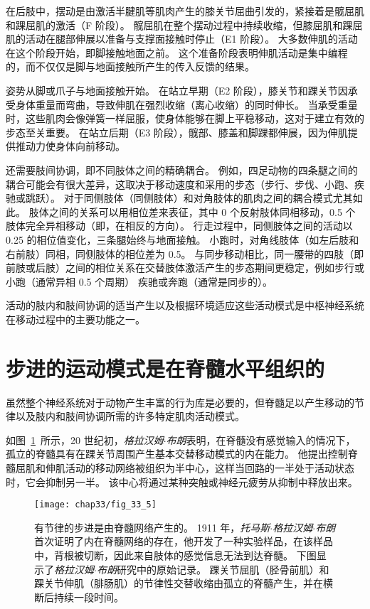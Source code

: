 在后肢中，摆动是由激活半腱肌等肌肉产生的膝关节屈曲引发的，紧接着是髋屈肌和踝屈肌的激活（F 阶段）。
髋屈肌在整个摆动过程中持续收缩，但膝屈肌和踝屈肌的活动在腿部伸展以准备与支撑面接触时停止（E1 阶段）。
大多数伸肌的活动在这个阶段开始，即脚接触地面之前。
这个准备阶段表明伸肌活动是集中编程的，而不仅仅是脚与地面接触所产生的传入反馈的结果。


姿势从脚或爪子与地面接触开始。
在站立早期（E2 阶段），膝关节和踝关节因承受身体重量而弯曲，导致伸肌在强烈收缩（离心收缩）的同时伸长。
当承受重量时，这些肌肉会像弹簧一样屈服，使身体能够在脚上平稳移动，这对于建立有效的步态至关重要。
在站立后期（E3 阶段），髋部、膝盖和脚踝都伸展，因为伸肌提供推动力使身体向前移动。


还需要肢间协调，即不同肢体之间的精确耦合。
例如，四足动物的四条腿之间的耦合可能会有很大差异，这取决于移动速度和采用的步态（步行、步伐、小跑、疾驰或跳跃）。
对于同侧肢体（同侧肢体）和对角肢体的肌肉之间的耦合模式尤其如此。
肢体之间的关系可以用相位差来表征，其中 0 个反射肢体同相移动，0.5 个肢体完全异相移动（即，在相反的方向）。
行走过程中，同侧肢体之间的活动以 0.25 的相位值变化，三条腿始终与地面接触。
小跑时，对角线肢体（如左后肢和右前肢）同相，同侧肢体的相位差为 0.5。
与同步移动相比，同一腰带的四肢（即前肢或后肢）之间的相位关系在交替肢体激活产生的步态期间更稳定，例如步行或小跑（通常异相 0.5 个周期） 疾驰或奔跑（通常是同步的）。


活动的肢内和肢间协调的适当产生以及根据环境适应这些活动模式是中枢神经系统在移动过程中的主要功能之一。



\section{步进的运动模式是在脊髓水平组织的}

虽然整个神经系统对于动物产生丰富的行为库是必要的，但脊髓足以产生移动的节律以及肢内和肢间协调所需的许多特定肌肉活动模式。


如图~\ref{fig:33_5}~所示，20 世纪初，\textit{格拉汉姆$\cdot$布朗}表明，在脊髓没有感觉输入的情况下，孤立的脊髓具有在踝关节周围产生基本交替移动模式的内在能力。
他提出控制脊髓屈肌和伸肌活动的移动网络被组织为半中心，这样当回路的一半处于活动状态时，它会抑制另一半。
该中心将通过某种突触或神经元疲劳从抑制中释放出来。


\begin{figure}[htbp]
	\centering
	\texttt{[image: chap33/fig\_33\_5]}
	\caption{有节律的步进是由脊髓网络产生的。
	1911 年，\textit{托马斯$\cdot$格拉汉姆$\cdot$布朗}首次证明了内在脊髓网络的存在，他开发了一种实验样品，在该样品中，背根被切断，因此来自肢体的感觉信息无法到达脊髓。
	下图显示了\textit{格拉汉姆$\cdot$布朗}研究中的原始记录。
	踝关节屈肌（胫骨前肌）和踝关节伸肌（腓肠肌）的节律性交替收缩由孤立的脊髓产生，并在横断后持续一段时间。}
	\label{fig:33_5}
\end{figure}


